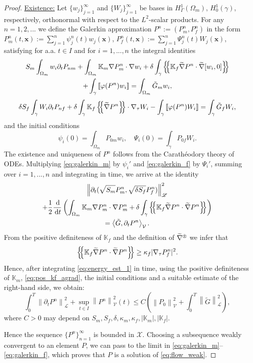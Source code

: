 \documentclass[a4paper]{article}
\numberwithin{equation}{section}
\def\agrad{\widetilde\nabla}
\def\avg#1{\left\{\mskip-5mu\left\{#1\right\}\mskip-5mu\right\}}
\def\d {\,{\rm d}}
\def\ddt#1{\frac{\d #1}{\d t}}
\def\dt{\prtl_t}
\def\dual#1#2{\left\langle #1,#2\right\rangle}
\def\Hf{\mathscr{L}} %
\def\jmp#1{\left\llbracket #1 \right\rrbracket}
\def\norm#1{\left\|#1\right\|}
\def\pphi{{\varphi}}
\def\prtl{\partial}
\def\tn#1{{\mathbb{#1}}}    %
\def\Vf{{\mathcal V}} %
\def\vc#1{\mathbf{#1}}     %
\def\xx{\vc x}
\newcommand{\opm}{
  {\mathbin{
    \mathchoice
      {\buildcirclepm{\displaystyle     }{0.14ex}{0.95}{0.05ex}{.7}}
      {\buildcirclepm{\textstyle        }{0.14ex}{0.95}{0.05ex}{.7}}
      {\buildcirclepm{\scriptstyle      }{0.13ex}{0.955}{0.04ex}{.55}}
      {\buildcirclepm{\scriptscriptstyle}{0.08ex}{0.95}{0.03ex}{.45}}
  }} 
}
\newcommand\buildcirclepm[5]{%
  \begin{tikzpicture}[baseline=(X.base), inner sep=-#5, outer sep=-.65]
    \node[draw,circle,line width=#4] (X)  {\footnotesize\raisebox{#2}{\scalebox{#3}{$#1\pm$}}};
  \end{tikzpicture}%
}
\newcommand{\eq}[1]{\begin{equation}#1\end{equation}}
\newcommand{\eqs}[1]{\begin{equation*}#1\end{equation*}}
\newcommand{\ml}[1]{\begin{multline}#1\end{multline}}
\begin{document}
\begin{proof}
\underline{Existence:}
Let $\{w_j\}_{j=1}^\infty$ and $\{W_j\}_{j=1}^\infty$ be bases in $H^1_\Gamma(\Omega_m)$, $H^1_0(\gamma)$, respectively, orthonormal with respect to the $L^2$-scalar products.
For any $n=1,2,...$ we define the Galerkin approximation $P^n:=(P_{m}^n,P_{f}^n)$ in the form $P_{m}^n(t,\xx):=\sum_{j=1}^n\psi_j^n(t)w_j(\xx)$, $P_{f}^n(t,\xx):=\sum_{j=1}^n\Psi_j^n(t)W_j(\xx)$, satisfying for a.a. $t\in I$ and for $i=1,...,n$ the integral identities
\ml{ \label{eq:galerkin_m} S_m\int_{\Omega_m}w_i\dt P_{nm} + \int_{\Omega_m}\tn K_m\nabla P_{m}^n\cdot\nabla w_i + \delta\int_\gamma\avg{\tn K_f\agrad P^n\cdot\agrad[w_i,0]}\\
+ \int_\gamma\jmp{\pphi(P^n) w_i} = \int_{\Omega_m}\tilde G_m w_i, }
\eq{ \label{eq:galerkin_f} \delta S_f\int_\gamma W_i\dt P_{nf} + \delta\int_\gamma\tn K_f\avg{\agrad P^n}\cdot\nabla_\tau W_i - \int_\gamma\jmp{\pphi(P^n)W_i} = \int_\gamma \tilde G_f W_i, }
and the initial conditions
\eqs{ \psi_i(0)=\int_{\Omega_m}P_{0m}w_i, \quad \Psi_i(0)=\int_\gamma P_{0f}W_i. }
The existence and uniqueness of $P^n$ follows from the Carath\'eodory theory of ODEs.
Multiplying \eqref{eq:galerkin_m} by $\psi_i'$ and \eqref{eq:galerkin_f} by $\Psi_i'$, summing over $i=1,...,n$ and integrating in time, we arrive at the identity
\ml{\label{eq:energy_est_1} \norm{\dt(\sqrt{S_m} P_{m}^n,\sqrt{\delta S_f} P_{f}^n)}_\Hf^2\\
+ \frac12\ddt{}\left(\int_{\Omega_m}\tn K_m\nabla P_{m}^n \cdot\nabla P_{m}^n
+ \delta\int_\gamma\avg{\tn K_f\agrad P^n\cdot\agrad P^n}\right)\\
= \dual{\tilde G}{\dt P^n}_\Vf. }
From the positive definiteness of $\tn K_f$ and the definition of $\agrad^\opm$ we infer that
\eq{ \label{eq:pos_kf_agrad} \avg{\tn K_f\agrad P^n\cdot\agrad P^n} \ge \kappa_f|\nabla_\tau P_{f}^n|^2. }
Hence, after integrating \eqref{eq:energy_est_1} in time, using the positive definiteness of $\tn K_m$, \eqref{eq:pos_kf_agrad}, the initial conditions and a suitable estimate of the right-hand side, we obtain:
\eq{ \label{eq:energy_est_flow} \int_0^T\norm{\dt P^n}_\Hf^2 + \sup_{t\in I}\norm{P^n}_\Vf^2(t) \le C\left(\norm{P_0}_\Vf^2 + \int_0^T\norm{\tilde G}_{\Hf}^2\right), }
where $C>0$ may depend on $S_m,S_f,\delta,\kappa_m,\kappa_f,|\tn K_m|,|\tn K_f|$.

Hence the sequence $\{P^n\}_{n=1}^\infty$ is bounded in $\mathcal X$.
Choosing a subsequence weakly convergent to an element $P$, we can pass to the limit in \eqref{eq:galerkin_m}--\eqref{eq:galerkin_f}, which proves that $P$ is a solution of \eqref{eq:flow_weak}.


\end{proof}
\end{document}
